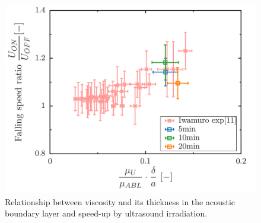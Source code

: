 \begin{figure}[ht]
    \begin{center}
        \includegraphics[width=13cm,clip]{5-Results/diff-iwamuro.png}
        \caption{Relationship between viscosity and its thickness in the acoustic boundary layer and speed-up by ultrasound irradiation.}
        \label{fig:speed-diff-iwamuro}
    \end{center}
\end{figure}